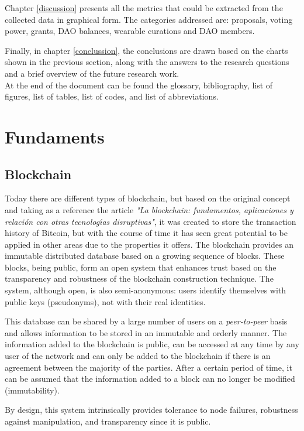 \documentclass[MSE,Master,english]{twbook}%
\begin{document}
Chapter \ref{discussion} presents all the metrics that could be extracted from the collected data in graphical form. The categories addressed are: proposals, voting power, grants, \gls{DAO} balances, wearable curations and \gls{DAO} members.

Finally, in chapter \ref{conclussion}, the conclusions are drawn based on the charts shown in the previous section, along with the answers to the research questions and a brief overview of the future research work. \\

At the end of the document can be found the glossary, bibliography, list of figures, list of tables, list of codes, and list of abbreviations.
\clearpage

\chapter{Fundaments\label{basics}}
\section{Blockchain}
Today there are different types of blockchain, but based on the original concept and taking as a reference the article \emph{"La blockchain: fundamentos, aplicaciones y relaci{\'o}n con otras tecnolog{\'\i}as disruptivas"}\cite{blockchain}, it was created to store the transaction history of Bitcoin, but with the course of time it has seen great potential to be applied in other areas due to the properties it offers. The blockchain provides an immutable distributed database based on a growing sequence of blocks. These blocks, being public, form an open system that enhances trust based on the transparency and robustness of the blockchain construction technique. The system, although open, is also semi-anonymous: users identify themselves with public keys (pseudonyms), not with their real identities.

This database can be shared by a large number of users on a \emph{peer-to-peer} basis and allows information to be stored in an immutable and orderly manner. The information added to the blockchain is public, can be accessed at any time by any user of the network and can only be added to the blockchain if there is an agreement between the majority of the parties. After a certain period of time, it can be assumed that the information added to a block can no longer be modified (immutability).

By design, this system intrinsically provides tolerance to node failures, robustness against manipulation, and transparency since it is public. \\
\end{document}
